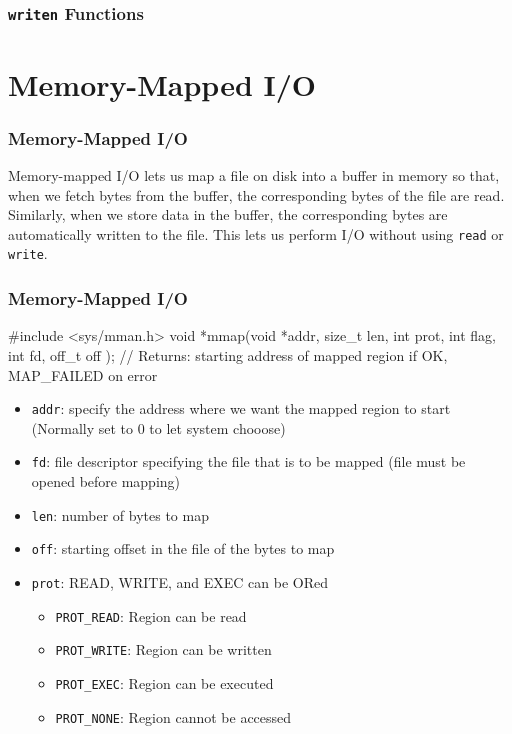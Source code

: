 \documentclass[newPxFont,sthlmFooter,nooffset]{beamer}
\begin{document}
\begin{frame}[t]
  \frametitle{\texttt{writen} Functions}
    

\end{frame}


\section{Memory-Mapped I/O}
\begin{frame}[t, fragile]
  \frametitle{Memory-Mapped I/O}
Memory-mapped I/O lets us map a file on disk into a buffer in memory so that, when we fetch bytes from the buffer, the corresponding bytes of the file are read.
\bigskip
Similarly, when we store data in the buffer, the corresponding bytes are automatically written to the file. This lets us perform I/O without using \texttt{read} or \texttt{write}.


\end{frame}

\begin{frame}[t, fragile]
  \frametitle{Memory-Mapped I/O}

\begin{codedef}
#include <sys/mman.h>
void *mmap(void *addr, size_t len, int prot, int flag, int fd, off_t off );
// Returns: starting address of mapped region if OK, MAP_FAILED on error
\end{codedef}
{\footnotesize
\begin{itemize}
\item \texttt{addr}: specify the address where we want the mapped region to start (Normally set to 0 to let system chooose)
\item \texttt{fd}: file descriptor specifying the file that is to be mapped (file must be opened before mapping)
\item \texttt{len}: number of bytes to map
\item \texttt{off}: starting offset in the file of the bytes to map
\item \texttt{prot}: READ, WRITE, and EXEC can be ORed
  \begin{itemize}
  \item \texttt{PROT\_READ}: Region can be read
  \item \texttt{PROT\_WRITE}: Region can be written
  \item \texttt{PROT\_EXEC}: Region can be executed
  \item \texttt{PROT\_NONE}: Region cannot be accessed
  \end{itemize}

\end{itemize}
}
\end{frame}
\end{document}
